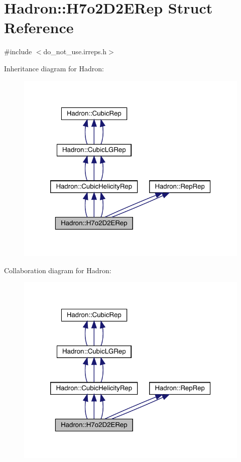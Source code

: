 \hypertarget{structHadron_1_1H7o2D2ERep}{}\section{Hadron\+:\+:H7o2\+D2\+E\+Rep Struct Reference}
\label{structHadron_1_1H7o2D2ERep}


{\ttfamily \#include $<$do\+\_\+not\+\_\+use.\+irreps.\+h$>$}



Inheritance diagram for Hadron\+:
\nopagebreak
\begin{figure}[H]
\begin{center}
\leavevmode
\includegraphics[width=320pt]{df/df8/structHadron_1_1H7o2D2ERep__inherit__graph}
\end{center}
\end{figure}


Collaboration diagram for Hadron\+:
\nopagebreak
\begin{figure}[H]
\begin{center}
\leavevmode
\includegraphics[width=320pt]{d4/d1f/structHadron_1_1H7o2D2ERep__coll__graph}
\end{center}
\end{figure}
